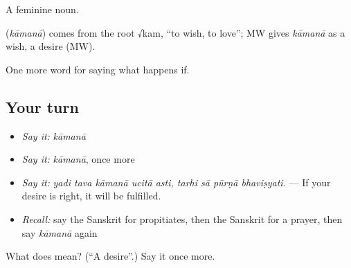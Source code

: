 A feminine noun.

\begin{cousinweb}
\textbf{} (\emph{kāmanā}) comes from the root √kam, \textquotedblleft{}to wish, to love\textquotedblright{}; MW gives \emph{kāmanā} as a wish, a desire (MW).
\end{cousinweb}

\begin{grammarlens}[title={What you've built}]
One more word for saying what happens if.
\end{grammarlens}

\subsection*{Your turn}
\begin{itemize}
\raggedright
  \item \emph{Say it:} \emph{kāmanā}
  \item \emph{Say it:} \emph{kāmanā}, once more
  \item \emph{Say it:} \emph{yadi tava kāmanā ucitā asti, tarhi sā pūrṇā bhaviṣyati.} — If your desire is right, it will be fulfilled.
  \item \emph{Recall:} say the Sanskrit for propitiates, then the Sanskrit for a prayer, then say \emph{kāmanā} again
\end{itemize}

\begin{tcolorbox}[breakable,colback=teal!4,colframe=teal!35!black,title={Before you move on}]
What does  mean? (\textquotedblleft{}A desire\textquotedblright{}.) Say it once more.
\end{tcolorbox}
